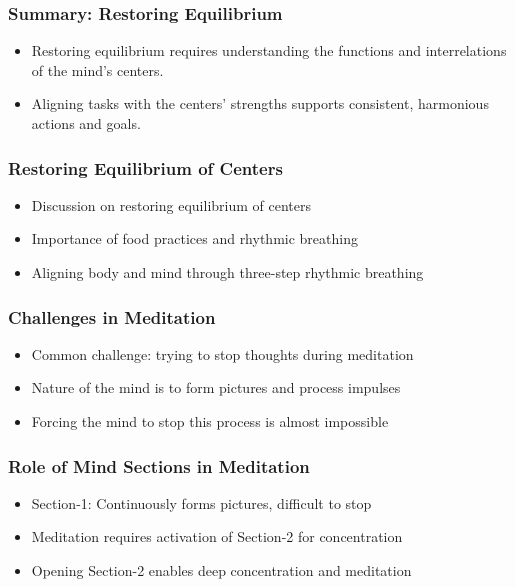 \begin{frame}[fragile]\frametitle{Summary: Restoring Equilibrium}
    \begin{itemize}
        \item Restoring equilibrium requires understanding the functions and interrelations of the mind’s centers.
        \item Aligning tasks with the centers’ strengths supports consistent, harmonious actions and goals.
    \end{itemize}
\end{frame}


\begin{frame}[fragile]\frametitle{Restoring Equilibrium of Centers}
    \begin{itemize}
        \item Discussion on restoring equilibrium of centers
        \item Importance of food practices and rhythmic breathing
        \item Aligning body and mind through three-step rhythmic breathing
    \end{itemize}
\end{frame}

\begin{frame}[fragile]\frametitle{Challenges in Meditation}
    \begin{itemize}
        \item Common challenge: trying to stop thoughts during meditation
        \item Nature of the mind is to form pictures and process impulses
        \item Forcing the mind to stop this process is almost impossible
    \end{itemize}
\end{frame}

\begin{frame}[fragile]\frametitle{Role of Mind Sections in Meditation}
    \begin{itemize}
        \item Section-1: Continuously forms pictures, difficult to stop
        \item Meditation requires activation of Section-2 for concentration
        \item Opening Section-2 enables deep concentration and meditation
    \end{itemize}
\end{frame}

